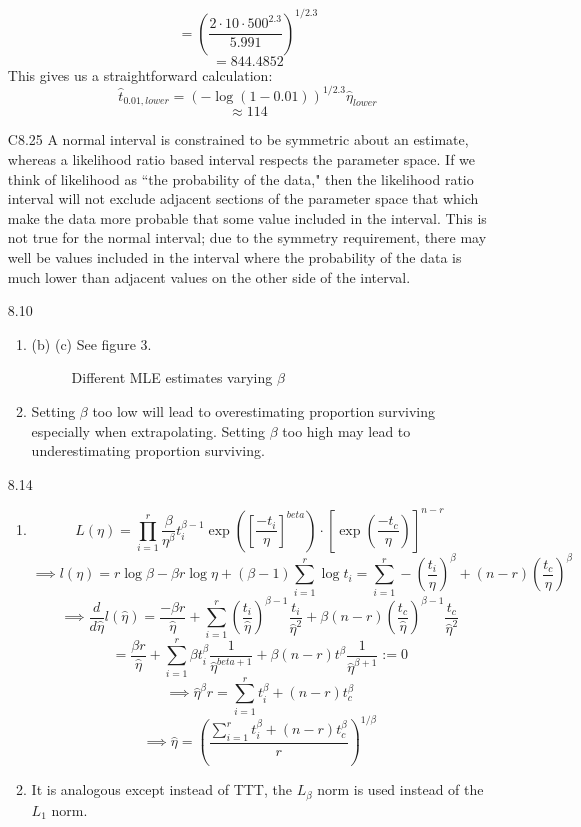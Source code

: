 \documentclass[12pt]{article}\usepackage[]{graphicx}\usepackage[]{color}
\begin{document}
\begin{enumerate}
\[= \left( \frac{2 \cdot 10 \cdot 500^{2.3}}{5.991}\right)^{1/2.3}\]
\[=844.4852\]
This gives us a straightforward calculation: 
\[\hat{t}_{0.01,lower} = (-\log(1-0.01))^{1/2.3} \hat{\eta}_{lower}\]
\[\approx 114\]

\item[C8.25]
A normal interval is constrained to be symmetric about an estimate, whereas a likelihood ratio based interval respects the parameter space. If we think of likelihood as ``the probability of the data," then the likelihood ratio interval will not exclude adjacent sections of the parameter space that which make the data more probable that some value included in the interval. This is not true for the normal interval; due to the symmetry requirement, there may well be values included in the interval where the probability of the data is much lower than adjacent values on the other side of the interval.

\item[8.10]
\begin{enumerate}
\item (b) (c) See figure 3.
\begin{figure}
\caption{Different MLE estimates varying $\beta$}
\end{figure}
\setcounter{enumii}{3}
\item Setting $\beta$ too low will lead to overestimating proportion surviving especially when extrapolating. Setting $\beta$ too high may lead to underestimating proportion surviving.
\end{enumerate}

\item[8.14]
\begin{enumerate}
  \item 
  \[L(\eta) = \prod_{i=1}^r \frac{\beta}{\eta^\beta}t_i^{\beta-1} \exp\left(\left[\frac{-t_i}{\eta}\right]^{beta}\right) \cdot \left[\exp\left(\frac{-t_c}{\eta}\right)\right]^{n-r}\]
  \[\implies l(\eta) = r\log \beta - \beta r \log \eta + (\beta-1)\sum_{i=1}^{r} \log t_i = \sum_{i=1}^r -\left(\frac{t_i}{\eta}\right)^\beta + (n-r)\left(\frac{t_c}{\eta}\right)^\beta\]
  \[\implies \frac{d}{d\hat{\eta}} l(\hat{\eta}) = \frac{-\beta r}{\hat{\eta}} + \sum_{i=1}^r \left(\frac{t_i}{\hat{\eta}}\right)^{\beta-1}\frac{t_i}{\hat{\eta}^2} + \beta(n-r)\left(\frac{t_c}{\hat{\eta}}\right)^{\beta-1} \frac{t_c}{\hat{\eta}^2}\]
  \[=\frac{\beta r}{\hat{\eta}} + \sum_{i=1}^r \beta t_i^\beta \frac{1}{\hat{\eta}^{beta+1}} + \beta(n-r) t^{\beta} \frac{1}{\hat{\eta}^{\beta+1}}:=0\]
  \[\implies \hat{\eta}^\beta r = \sum_{i=1}^r t_i^{\beta} + (n-r)t_c^\beta\]
  \[\implies \hat{\eta} = \left(\frac{\sum_{i=1}^r t_i^{\beta} + (n-r)t_c^\beta}{r}\right)^{1/\beta}\]
  \item It is analogous except instead of TTT, the $L_\beta$ norm is used instead of the $L_1$ norm.
\end{enumerate}


\end{enumerate}
\end{document}
